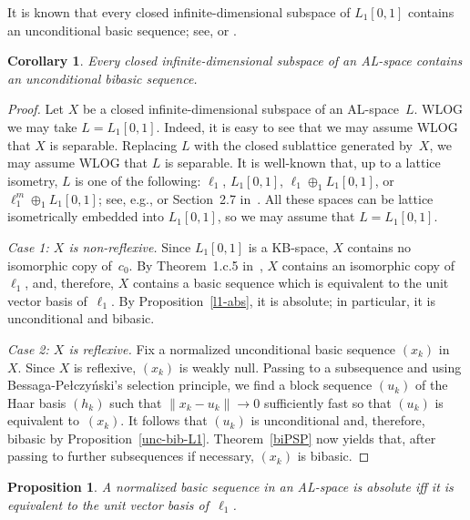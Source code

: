 \documentclass[12pt]{amsart}
\theoremstyle{plain}
\newtheorem{proposition}[theorem]{Proposition}
\newtheorem{corollary}[theorem]{Corollary}
\theoremstyle{definition}
\newcommand{\norm}[1]{\lVert#1\rVert}
\begin{document}
It is known that every closed infinite-dimensional subspace of
$L_1[0,1]$ contains an unconditional basic sequence; see,
\cite[Corollary~12]{Rosenthal:73} or \cite[p.~38]{Lindenstrauss:79}. 

\begin{corollary}\label{sub-L1-unc-bib}
  Every closed infinite-dimensional subspace of an AL-space contains
  an unconditional bibasic sequence.
\end{corollary}

\begin{proof}
  Let $X$ be a closed infinite-dimensional subspace of an
  AL-space~$L$. WLOG we may take $L=L_1[0,1]$. Indeed, it is easy to
  see that we may assume WLOG that $X$ is separable. Replacing $L$
  with the closed sublattice generated by~$X$, we may assume WLOG that
  $L$ is separable. It is well-known that, up to a lattice isometry,
  $L$ is one of the following: $\ell_1$, $L_1[0,1]$,
  $\ell_1\oplus_1L_1[0,1]$, or $\ell_1^m\oplus_1L_1[0,1]$; see, e.g.,
  \cite{Lacey:76} or Section~2.7 in~\cite{Meyer-Nieberg:91}.  All
  these spaces can be lattice isometrically embedded into $L_1[0,1]$,
  so we may assume that $L=L_1[0,1]$.

  \emph{Case 1: $X$ is non-reflexive.} Since $L_1[0,1]$ is a KB-space,
  $X$ contains no isomorphic copy of~$c_0$. By Theorem~1.c.5
  in~\cite{Lindenstrauss:79}, $X$ contains an isomorphic copy
  of~$\ell_1$, and, therefore, $X$ contains a basic sequence which is
  equivalent to the unit vector basis of~$\ell_1$. By
  Proposition~\ref{l1-abs}, it is absolute; in particular, it is
  unconditional and bibasic.
   
  \emph{Case 2: $X$ is reflexive.}  Fix a normalized unconditional basic
  sequence $(x_k)$ in~$X$. Since $X$ is reflexive, $(x_k)$ is weakly
  null. Passing to a subsequence and using
  Bessaga-Pe{\l}\-czy{\'n}\-ski's selection principle, we find a block
  sequence $(u_k)$ of the Haar basis $(h_k)$ such that
  $\norm{x_k-u_k}\to 0$ sufficiently fast so that $(u_k)$ is
  equivalent to~$(x_k)$. It follows that $(u_k)$ is unconditional and,
  therefore, bibasic by
  Proposition~\ref{unc-bib-L1}. Theorem~\ref{biPSP} now yields that,
  after passing to further subsequences if necessary, $(x_k)$ is bibasic.
\end{proof}

\begin{proposition}
  A normalized basic sequence in an AL-space is absolute
  iff it is equivalent to the unit vector basis of~$\ell_1$.
\end{proposition}
\end{document}
